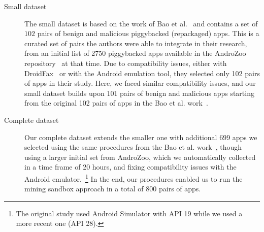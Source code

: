 \begin{description}
\item[Small dataset] The small dataset is based on the work of Bao et al.~\cite{DBLP:conf/wcre/BaoLL18} and contains a set of $102$ pairs of benign and malicious piggybacked (repackaged) apps. This is a curated
  set of pairs the authors were able to integrate in their research, from an initial list of \num{2750} piggybacked apps available in the AndroZoo repository~\cite{DBLP:conf/msr/AllixBKT16} at that time. Due to compatibility
  issues, either with DroidFax~\cite{DBLP:conf/icsm/CaiR17a}
  or with the Android emulation tool, they selected only 102 pairs
  of apps in their study. Here, we faced similar compatibility issues, and our small dataset
  builds upon $101$ pairs of benign and malicious apps starting from the
  original 102 pairs of apps in the Bao et al. work~\cite{DBLP:conf/wcre/BaoLL18}.
  
\item[Complete dataset] Our complete dataset extends the smaller one with additional $699$ apps we selected using the same procedures from the Bao et al. work~\cite{DBLP:conf/wcre/BaoLL18}, though
  using a larger initial set from AndroZoo, which we automatically collected in a time frame of 20 hours, and fixing compatibility issues with the Android emulator.~\footnote{The original study used Android Simulator with API 19 while we used a more recent one (API 28).} In the end,
  our procedures enabled us to run the mining sandbox approach in a total of $800$ pairs of apps.   
\end{description}  
  
